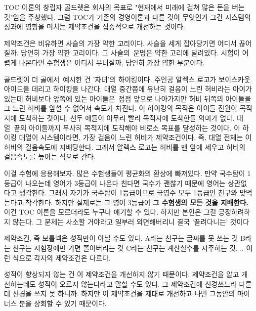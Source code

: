 TOC 이론의 창립자 골드렛은 회사의 목표로 "현재에서 미래에 걸쳐 많은 돈을 버는 것"임을 주창했다.
그럼 TOC가 기존의 경영이론과 다른 것이 무엇인가
그건 시스템의 성과에 영향을 미치는 제약조건을 집중적으로 개선하는 것이다.
\vspace{5mm}

제약조건은 비유하면 사슬의 가장 약한 고리이다.
사슬을 세게 잡아당기면 어디서 끊어질까. 당연히 가장 약한 고리이다.
그 사슬의 운명은 약한 고리에 달려있다.
시험이 어렵게 나온다면 수험생은 어디서 무너질까, 당연히 가장 약한 부분이다.
\vspace{5mm}

골드렛이 더 골에서 예시한 건 '자녀'의 하이킹이다.
주인공 알렉스 로고가 보이스카웃 아이드을 데리고 하이킹을 나간다.
대열 중간쯤에 유난히 걸음이 느린 허비라는 아이가 있는데 허비보다 앞쪽에 있는 아이들은 점점 앞으로 나아가지만
허비 뒤쪽의 아이들을 그 느린 허비를 앞설 수 없어서 속도가 처진다.
이 하이킹의 목적은 아이들 전원이 목적지에 도착하는 것이다. 선두 애들이 아무리 빨리 목적자에 도착한들 의미가 없다.
대열 끝의 아이들까지 무사히 목적지에 도착해야 비로소 목표를 달성하는 것이다.
이 하이킹 대열이 시스템이라면, 가장 걸음이 느린 허비가 제약조건이다.
즉, 대열 전체는 이 허비의 걸음속도에 지배당한다.
그래서 알렉스 로고는 허비를 맨 앞에 세우고 허비의 걸음속도를 높이는 식으로 간다.
\vspace{5mm}

이걸 수험에 응용해보자. 많은 수험생들이 평균화의 환상에 빠져있다.
만약 국수탐이 1등급이 나오는데 영어가 3등급이 나온다 친다면 국수가 괜찮기 때문에 영어는 상관없다고 생각한다.
그래서 자기가 국수탐이 1등급이므로 국영수 모두 1등급인 친구와 맞먹는다고 착각한다.
하지만 실제로는 그 영어 3등급이 \textbf{그 수험생의 모든 것을 지배한다.}
이건 TOC 이론을 모르더라도 누구나 얘기할 수 있다. 하지만 본인은 그걸 긍정하려하지 않는다.
그 문제는 사소할 거야라고 일부러 외면해버리니 결국 '끌려다니는' 것이다
\vspace{5mm}

제약조건, 즉 보틀넥은 성적만이 아닐 수도 있다.
A라는 친구는 글씨를 못 쓰는 것
B라는 친구는 시험장에만 가면 쫄아버리는 것
C라는 친구는 계산실수를 자주하는 것.
.. 이런 식으로 각자의 제약조건은 다르다.
\vspace{5mm}

성적이 향상되지 않는 건 이 제약조건을 개선하지 않기 때문이다.
제약조건을 알고 개선하는데도 성적이 오르지 않는다라고 말할 수도 있다. 그 제약조건에 신경쓰느라 다른 데 신경을 쓰지 못 하니까.
하지만 이 제약조건을 제대로 개선하고 나면 그동안의 마이너스 분을 상회할 수 있기 때문이다.
\vspace{5mm}










